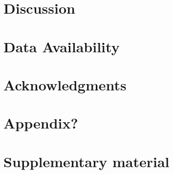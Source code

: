 

\section{Discussion}



\section*{Data Availability}



\section*{Acknowledgments}





\clearpage
\setcounter{table}{0}
\renewcommand{\thetable}{S\arabic{table}}
\setcounter{figure}{0}
\renewcommand{\thefigure}{S\arabic{figure}}
\setcounter{section}{1}
\renewcommand \thesection{S\arabic{section}}

\section*{Appendix?}



\section*{Supplementary material}




